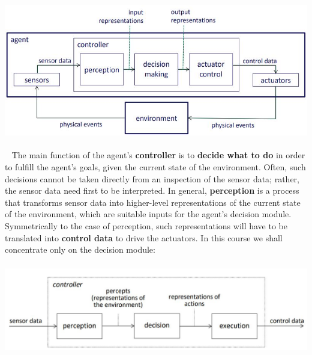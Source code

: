 \begin{center}
    \includegraphics[height=6cm]{../arguments/SensorsAndActuators.JPG}
\end{center}
\ \newline
The main function of the agent’s \textbf{controller} is to \textbf{decide what to do} in order to fulfill the
agent’s goals, given the current state of the environment. Often, such decisions cannot be taken directly from an inspection of the sensor data;
rather, the sensor data need first to be interpreted.\newline
In general, \textbf{perception} is a process that transforms sensor data into higher-level
representations of the current state of the environment, which are suitable inputs for the
agent’s decision module.\newline
Symmetrically to the case of perception, such representations will have to be translated
into \textbf{control data} to drive the actuators.
\newline
\newline
In this course we shall concentrate only on the decision module:
\begin{center}
    \includegraphics[height=4cm]{../arguments/decisionModule.JPG}
\end{center}
